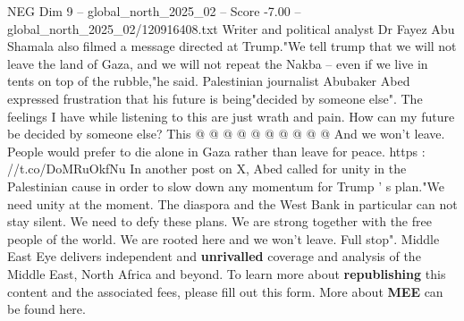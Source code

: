 \begin{textsample}{NEG Dim 9 – global\_north\_2025\_02 – Score -7.00 – global\_north\_2025\_02/120916408.txt}
Writer and political analyst Dr Fayez Abu Shamala also filmed a message directed at Trump."We tell trump that we will not leave the land of Gaza, and we will not repeat the Nakba -- even if we live in tents on top of the rubble,"he said.
Palestinian journalist Abubaker Abed expressed frustration that his future is being"decided by someone else".
The feelings I have while listening to this are just wrath and pain.
How can my future be decided by someone else?
This @ @ @ @ @ @ @ @ @ @ And we won't leave.
People would prefer to die alone in Gaza rather than leave for peace. https : //t.co/DoMRuOkfNu In another post on X, Abed called for unity in the Palestinian cause in order to slow down any momentum for Trump ' s plan."We need unity at the moment.
The diaspora and the West Bank in particular can not stay silent.
We need to defy these plans.
We are strong together with the free people of the world.
We are rooted here and we won't leave.
Full stop".
Middle East Eye delivers independent and \textbf{unrivalled} coverage and analysis of the Middle East, North Africa and beyond.
To learn more about \textbf{republishing} this content and the associated fees, please fill out this form.
More about \textbf{MEE} can be found here.

\end{textsample}
